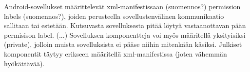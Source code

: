 Android-sovellukset määrittelevät xml-manifestissaan (suomennos?) permission labels (suomennos?), joiden perusteella sovellustenvälinen kommunikaatio sallitaan tai estetään. Kutsuvasta sovelluksesta pitää löytyä vastaanottavan pään permisison label. (...) Sovelluksen komponentteja voi myös määritellä yksityisiksi (private), jolloin muista sovelluksista ei pääse niihin mitenkään käsiksi. Julkiset komponentit täytyy erikseen määritellä xml-manifestissa (joten vähemmän hyökättävää).

\cite{android_security}